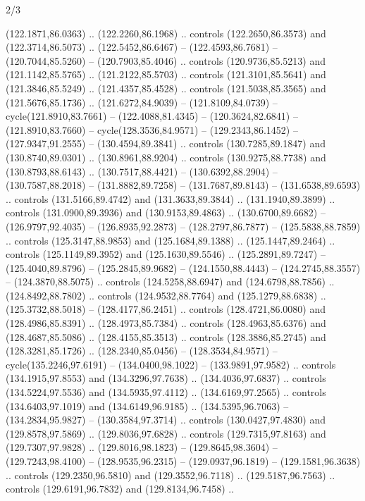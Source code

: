 \begin{flagdescription}{2/3}
\begin{scope}[scale=0.00214\flagwidth,yshift=164.5mm]
\begin{scope}[y=-0.8pt, x=0.8pt, inner sep=0pt, outer sep=0pt]
\begin{scope}[fill=black]
  (122.1871,86.0363) .. (122.2260,86.1968) .. controls (122.2650,86.3573) and
  (122.3714,86.5073) .. (122.5452,86.6467) -- (122.4593,86.7681) --
  (120.7044,85.5260) -- (120.7903,85.4046) .. controls (120.9736,85.5213) and
  (121.1142,85.5765) .. (121.2122,85.5703) .. controls (121.3101,85.5641) and
  (121.3846,85.5249) .. (121.4357,85.4528) .. controls (121.5038,85.3565) and
  (121.5676,85.1736) .. (121.6272,84.9039) -- (121.8109,84.0739) --
  cycle(121.8910,83.7661) -- (122.4088,81.4345) -- (120.3624,82.6841) --
  (121.8910,83.7660) -- cycle(128.3536,84.9571) -- (129.2343,86.1452) --
  (127.9347,91.2555) -- (130.4594,89.3841) .. controls (130.7285,89.1847) and
  (130.8740,89.0301) .. (130.8961,88.9204) .. controls (130.9275,88.7738) and
  (130.8793,88.6143) .. (130.7517,88.4421) -- (130.6392,88.2904) --
  (130.7587,88.2018) -- (131.8882,89.7258) -- (131.7687,89.8143) --
  (131.6538,89.6593) .. controls (131.5166,89.4742) and (131.3633,89.3844) ..
  (131.1940,89.3899) .. controls (131.0900,89.3936) and (130.9153,89.4863) ..
  (130.6700,89.6682) -- (126.9797,92.4035) -- (126.8935,92.2873) --
  (128.2797,86.7877) -- (125.5838,88.7859) .. controls (125.3147,88.9853) and
  (125.1684,89.1388) .. (125.1447,89.2464) .. controls (125.1149,89.3952) and
  (125.1630,89.5546) .. (125.2891,89.7247) -- (125.4040,89.8796) --
  (125.2845,89.9682) -- (124.1550,88.4443) -- (124.2745,88.3557) --
  (124.3870,88.5075) .. controls (124.5258,88.6947) and (124.6798,88.7856) ..
  (124.8492,88.7802) .. controls (124.9532,88.7764) and (125.1279,88.6838) ..
  (125.3732,88.5018) -- (128.4177,86.2451) .. controls (128.4721,86.0080) and
  (128.4986,85.8391) .. (128.4973,85.7384) .. controls (128.4963,85.6376) and
  (128.4687,85.5086) .. (128.4155,85.3513) .. controls (128.3886,85.2745) and
  (128.3281,85.1726) .. (128.2340,85.0456) -- (128.3534,84.9571) --
  cycle(135.2246,97.6191) -- (134.0400,98.1022) -- (133.9891,97.9582) ..
  controls (134.1915,97.8553) and (134.3296,97.7638) .. (134.4036,97.6837) ..
  controls (134.5224,97.5536) and (134.5935,97.4112) .. (134.6169,97.2565) ..
  controls (134.6403,97.1019) and (134.6149,96.9185) .. (134.5395,96.7063) --
  (134.2834,95.9827) -- (130.3584,97.3714) .. controls (130.0427,97.4830) and
  (129.8578,97.5869) .. (129.8036,97.6828) .. controls (129.7315,97.8163) and
  (129.7307,97.9828) .. (129.8016,98.1823) -- (129.8645,98.3604) --
  (129.7243,98.4100) -- (128.9535,96.2315) -- (129.0937,96.1819) --
  (129.1581,96.3638) .. controls (129.2350,96.5810) and (129.3552,96.7118) ..
  (129.5187,96.7563) .. controls (129.6191,96.7832) and (129.8134,96.7458) ..

\end{scope}
\end{scope}
\end{scope}
\end{flagdescription}
